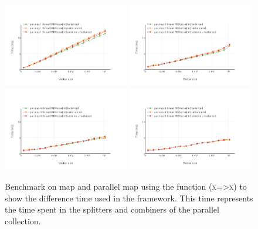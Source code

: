 \begin{figure}[h!]
  \centering
  \includegraphics[width=0.49\textwidth]{Benchmarks/parmap_unbalanced_1.pdf}
  \includegraphics[width=0.49\textwidth]{Benchmarks/parmap_unbalanced_2.pdf}
  \includegraphics[width=0.49\textwidth]{Benchmarks/parmap_unbalanced_4.pdf}
  \includegraphics[width=0.49\textwidth]{Benchmarks/parmap_unbalanced_8.pdf}
  \label{ParallelUnbalancedBenchmarks}
  \caption{Benchmark on map and parallel map using the function (\textsc{x=>x}) to show the difference time used in the framework. This time represents the time spent in the splitters and combiners of the parallel collection.}
\end{figure}



